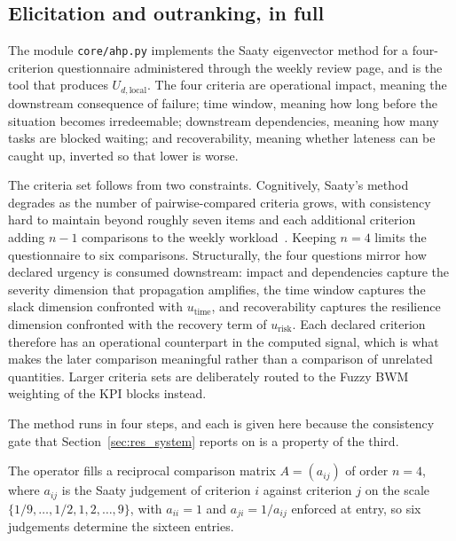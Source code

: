 \subsection{Elicitation and outranking, in full}
\label{sec:ahp_tool}

The module \texttt{core/ahp.py} implements the Saaty eigenvector method for a four-criterion
questionnaire administered through the weekly review page, and is the tool that produces
$U_{d,\text{local}}$. The four criteria are operational impact, meaning the downstream
consequence of failure; time window, meaning how long before the situation becomes
irredeemable; downstream dependencies, meaning how many tasks are blocked waiting; and
recoverability, meaning whether lateness can be caught up, inverted so that lower is worse.

The criteria set follows from two constraints. Cognitively, Saaty's method degrades as the
number of pairwise-compared criteria grows, with consistency hard to maintain beyond roughly
seven items and each additional criterion adding $n-1$ comparisons to the weekly
workload~\autocite{saaty1990how,triantaphyllou2024}. Keeping $n = 4$ limits the
questionnaire to six comparisons. Structurally, the four questions mirror how declared
urgency is consumed downstream: impact and dependencies capture the severity dimension that
propagation amplifies, the time window captures the slack dimension confronted with
$u_{\text{time}}$, and recoverability captures the resilience dimension confronted with the
recovery term of $u_{\text{risk}}$. Each declared criterion therefore has an operational counterpart in the computed signal,
which is what makes the later comparison meaningful rather than a comparison of unrelated
quantities. Larger criteria sets are deliberately routed to the Fuzzy BWM weighting of the
KPI blocks instead.

The method runs in four steps, and each is given here because the consistency gate that
Section~\ref{sec:res_system} reports on is a property of the third.

The operator fills a reciprocal comparison matrix $A = (a_{ij})$ of order $n = 4$, where
$a_{ij}$ is the Saaty judgement of criterion $i$ against criterion $j$ on the scale
$\{1/9, \ldots, 1/2, 1, 2, \ldots, 9\}$, with $a_{ii} = 1$ and $a_{ji} = 1/a_{ij}$ enforced
at entry, so six judgements determine the sixteen entries.

